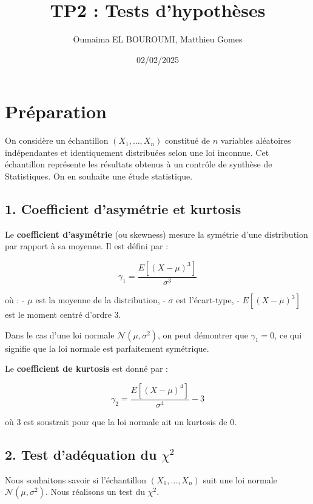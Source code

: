 \documentclass{article}
\title{TP2 : Tests d’hypothèses}
\author{Oumaima EL BOUROUMI, Matthieu Gomes}
\date{02/02/2025}
\begin{document}
\maketitle



\section{Préparation}

On considère un échantillon \( (X_1, \dots, X_n) \) constitué de \( n \) variables aléatoires indépendantes et identiquement distribuées selon une loi inconnue. Cet échantillon représente les résultats obtenus à un contrôle de synthèse de Statistiques. On en souhaite une étude statistique.

\subsection{1. Coefficient d’asymétrie et kurtosis}

Le \textbf{coefficient d’asymétrie} (ou skewness) mesure la symétrie d’une distribution par rapport à sa moyenne. Il est défini par :

\[
\gamma_1 = \frac{E[(X - \mu)^3]}{\sigma^3}
\]

où :
- \( \mu \) est la moyenne de la distribution,
- \( \sigma \) est l’écart-type,
- \( E[(X - \mu)^3] \) est le moment centré d’ordre 3.

Dans le cas d’une loi normale \( \mathcal{N}(\mu, \sigma^2) \), on peut démontrer que \( \gamma_1 = 0 \), ce qui signifie que la loi normale est parfaitement symétrique.

Le \textbf{coefficient de kurtosis} est donné par :

\[
\gamma_2 = \frac{E[(X - \mu)^4]}{\sigma^4} - 3
\]

où \( 3 \) est soustrait pour que la loi normale ait un kurtosis de 0.

\subsection{2. Test d’adéquation du \( \chi^2 \)}

Nous souhaitons savoir si l’échantillon \( (X_1, \dots, X_n) \) suit une loi normale \( \mathcal{N}(\mu, \sigma^2) \). Nous réalisons un test du \( \chi^2 \).
\end{document}
